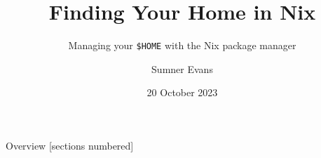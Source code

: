 \documentclass{nix}
\title{Finding Your Home in Nix}
\subtitle{Managing your \texttt{\$HOME} with the Nix package manager}
\author{Sumner Evans}
\date{20 October 2023}
\begin{document}
\begin{frame}{Overview}
    [sections numbered]
    \tableofcontents[hideallsubsections]
\end{frame}
\end{document}
